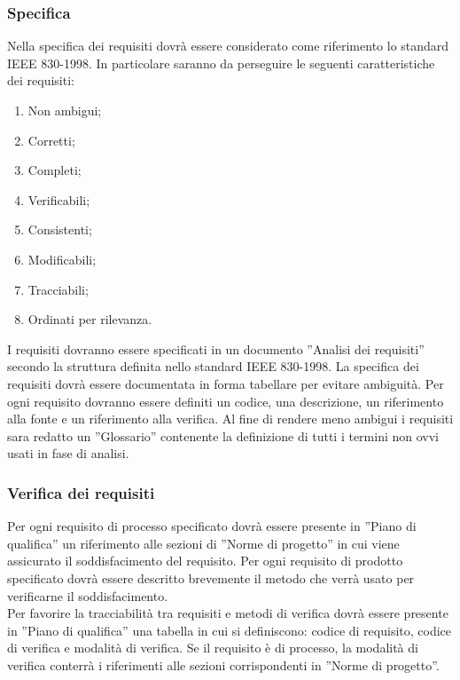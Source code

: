 {{			\subsubsection{Specifica}{
				Nella specifica dei requisiti dovr\`{a} essere considerato come riferimento lo standard IEEE 830-1998. In particolare saranno da perseguire le seguenti caratteristiche dei requisiti:
				\begin{enumerate}
					\item Non ambigui;
					\item Corretti;
					\item Completi;
					\item Verificabili;
					\item Consistenti;
					\item Modificabili;
					\item Tracciabili;
					\item Ordinati per rilevanza.
				\end{enumerate}
				I requisiti dovranno essere specificati in un documento ”Analisi dei requisiti” secondo la struttura definita nello standard IEEE 830-1998. La specifica dei requisiti dovr\`{a} essere documentata in forma tabellare per evitare ambiguit\`{a}. Per ogni requisito dovranno essere definiti un codice, una descrizione, un riferimento alla fonte e un riferimento alla verifica. Al fine di rendere meno ambigui i requisiti sara redatto un ”Glossario” contenente la definizione di tutti i termini non ovvi usati in fase di analisi.
			}
			\subsubsection{Verifica dei requisiti}{
				Per ogni requisito\ped{g} di processo specificato dovr\`{a} essere presente in ”Piano di qualifica” un riferimento alle sezioni di ”Norme di progetto” in cui viene assicurato il soddisfacimento del requisito. Per ogni requisito di prodotto specificato dovr\`{a} essere descritto brevemente il metodo che verr\`{a} usato per verificarne il soddisfacimento.\\Per favorire la tracciabilit\`{a} tra requisiti e metodi di verifica dovr\`{a} essere presente in ”Piano di qualifica” una tabella in cui si definiscono: codice\ped{g} di requisito, codice di verifica e modalit\`{a} di verifica. Se il requisito \`{e} di processo, la modalit\`{a} di verifica conterr\`{a} i riferimenti alle sezioni corrispondenti in ”Norme di progetto”.
			}
		}
}
